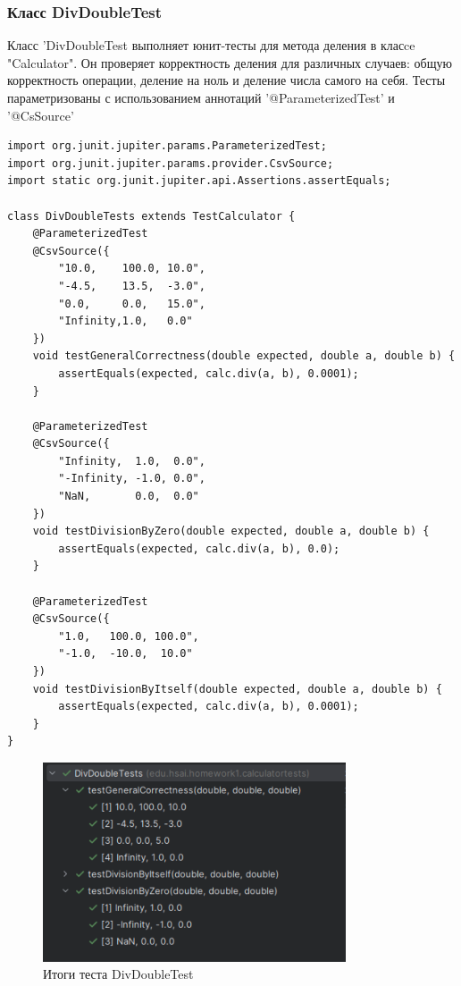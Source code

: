 \documentclass[areasetadvanced]{scrartcl}
\begin{document}
\subsubsection{Класс DivDoubleTest}
Класс 'DivDoubleTest выполняет юнит-тесты для метода деления в класce "Calculator". Он проверяет корректность деления для различных случаев: общую корректность операции, деление на ноль и деление числа самого на себя. Тесты параметризованы с использованием аннотаций '@ParameterizedTest'
и '@CsSource'
\begin{lstlisting}[caption={Класс DivDoubleTest}]
import org.junit.jupiter.params.ParameterizedTest;
import org.junit.jupiter.params.provider.CsvSource;
import static org.junit.jupiter.api.Assertions.assertEquals;

class DivDoubleTests extends TestCalculator {
    @ParameterizedTest
    @CsvSource({
        "10.0,    100.0, 10.0",
        "-4.5,    13.5,  -3.0",
        "0.0,     0.0,   15.0",
        "Infinity,1.0,   0.0"
    })
    void testGeneralCorrectness(double expected, double a, double b) {
        assertEquals(expected, calc.div(a, b), 0.0001);
    }

    @ParameterizedTest
    @CsvSource({
        "Infinity,  1.0,  0.0",
        "-Infinity, -1.0, 0.0",
        "NaN,       0.0,  0.0"
    })
    void testDivisionByZero(double expected, double a, double b) {
        assertEquals(expected, calc.div(a, b), 0.0);
    }

    @ParameterizedTest
    @CsvSource({
        "1.0,   100.0, 100.0",
        "-1.0,  -10.0,  10.0"
    })
    void testDivisionByItself(double expected, double a, double b) {
        assertEquals(expected, calc.div(a, b), 0.0001);
    }
}

\end{lstlisting}
\begin{figure}[H]
	\centering
	\includegraphics[width=0.8\textwidth]{images/DivTest.png}
	\caption{Итоги теста DivDoubleTest}
	\label{fig:syntdiag}
\end{figure}
\end{document}

